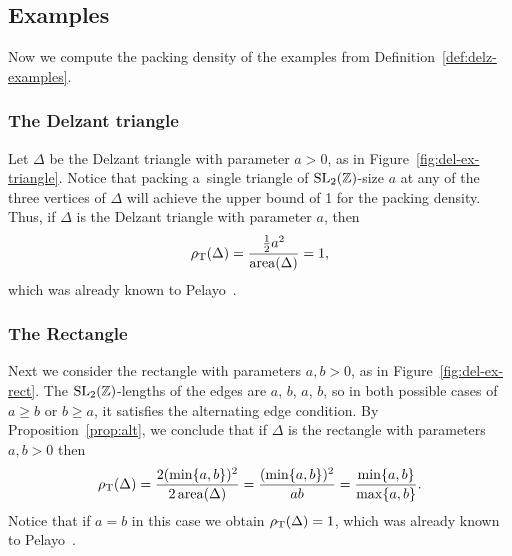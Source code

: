 \documentclass[10pt,a4paper]{amsart}
\numberwithin{equation}{section}
\def\Z{{\mathbb Z}}
\newcommand{\De}{\Delta}
\newcommand{\area}{\operatorname{area}}
\newcommand{\SL}{{\rm SL}_2(\Z)}
\theoremstyle{definition}
\theoremstyle{plain}
\theoremstyle{plain}
\begin{document}



\subsection{Examples}

Now we compute the packing density of the examples from Definition~\ref{def:delz-examples}.

\subsubsection{The Delzant triangle}
Let $\De$ be the Delzant triangle with parameter $a>0$, as in Figure~\ref{fig:del-ex-triangle}.
Notice that packing a~single triangle of $\SL$-size $a$ at any of the three vertices of $\De$ will achieve the upper bound of 1 for the packing density.
Thus, if $\De$ is the Delzant triangle with parameter $a$, then
\begin{equation}\label{eqn:pack-density-triangle}
 \rho_{{\rm T}}(\De) = \frac{\frac{1}{2}a^2}{\area(\De)} = 1,
\end{equation}
which was already known to Pelayo~\cite{Pe2006}.

\subsubsection{The Rectangle} Next we consider the rectangle with parameters $a,b>0$, as in Figure~\ref{fig:del-ex-rect}. The $\SL$-lengths of the edges are $a$, $b$, $a$, $b$, so in both possible cases of $a\geq b$ or $b\geq a$, it satisfies the alternating edge condition. By Proposition~\ref{prop:alt}, we conclude that if $\De$ is the rectangle with parameters~$a,b>0$ then
\begin{equation}\label{eqn:pack-density-rect}
 \rho_{{\rm T}}(\De) = \frac{2(\min\{a,b\})^2}{2\area(\De)} = \frac{(\min\{a,b\})^2}{ab}=\frac{\min\{a,b\}}{\max\{a,b\}}.
\end{equation}
Notice that if $a=b$ in this case we obtain $\rho_{{\rm T}}(\De) =1$, which was already known to Pelayo~\cite{Pe2006}.
\end{document}
